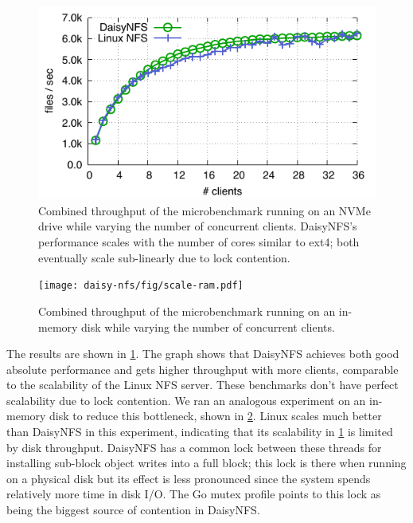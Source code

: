 \begin{figure}[hp]
  \includegraphics{daisy-nfs/fig/scale.pdf}
  \caption[Concurrent smallfile performance]%
{Combined throughput of the  microbenchmark running on
    an NVMe drive while
    varying the number of concurrent clients. DaisyNFS's performance scales with the
    number of cores similar to ext4; both eventually scale
    sub-linearly due to lock contention.}
  \label{fig:eval:scale}
\end{figure}

\begin{figure}[hp]
  \texttt{[image: daisy-nfs/fig/scale-ram.pdf]}
  \caption[Concurrent smallfile performance, with RAM disk]%
  {Combined throughput of the  microbenchmark running on an
    in-memory disk while varying the number of concurrent clients.}
  \label{fig:eval:scale-ram}
\end{figure}

The results are shown in \cref{fig:eval:scale}. The graph shows that DaisyNFS
achieves both good absolute performance and gets higher throughput with more
clients, comparable to the scalability of the Linux NFS server. These benchmarks
don't have perfect scalability due to lock contention. We ran an analogous experiment on an
in-memory disk to reduce this bottleneck, shown in \cref{fig:eval:scale-ram}.
Linux scales much better than DaisyNFS in this experiment, indicating that its
scalability in \cref{fig:eval:scale} is limited by disk throughput. DaisyNFS has a common
lock between these threads for installing sub-block object writes into a full
block; this lock is there when running on a physical disk but its effect is less
pronounced since the system spends relatively more time in disk I/O. The Go
mutex profile points to this lock as being the biggest source of contention in
DaisyNFS.

